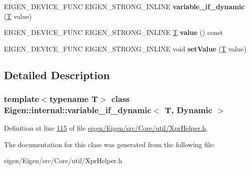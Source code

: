 \begin{DoxyCompactItemize}
E\+I\+G\+E\+N\+\_\+\+D\+E\+V\+I\+C\+E\+\_\+\+F\+U\+NC E\+I\+G\+E\+N\+\_\+\+S\+T\+R\+O\+N\+G\+\_\+\+I\+N\+L\+I\+NE {\bfseries variable\+\_\+if\+\_\+dynamic} (\hyperlink{group___sparse_core___module}{T} value)
\item 
\mbox{\label{class_eigen_1_1internal_1_1variable__if__dynamic_3_01_t_00_01_dynamic_01_4_a888489cd207291bb18a71545f94a7529}} 
E\+I\+G\+E\+N\+\_\+\+D\+E\+V\+I\+C\+E\+\_\+\+F\+U\+NC E\+I\+G\+E\+N\+\_\+\+S\+T\+R\+O\+N\+G\+\_\+\+I\+N\+L\+I\+NE \hyperlink{group___sparse_core___module}{T} {\bfseries value} () const
\item 
\mbox{\label{class_eigen_1_1internal_1_1variable__if__dynamic_3_01_t_00_01_dynamic_01_4_a8557515f971577b2e7949a69577513fd}} 
E\+I\+G\+E\+N\+\_\+\+D\+E\+V\+I\+C\+E\+\_\+\+F\+U\+NC E\+I\+G\+E\+N\+\_\+\+S\+T\+R\+O\+N\+G\+\_\+\+I\+N\+L\+I\+NE void {\bfseries set\+Value} (\hyperlink{group___sparse_core___module}{T} value)
\end{DoxyCompactItemize}


\subsection{Detailed Description}
\subsubsection*{template$<$typename T$>$\newline
class Eigen\+::internal\+::variable\+\_\+if\+\_\+dynamic$<$ T, Dynamic $>$}



Definition at line \hyperlink{eigen_2_eigen_2src_2_core_2util_2_xpr_helper_8h_source_l00115}{115} of file \hyperlink{eigen_2_eigen_2src_2_core_2util_2_xpr_helper_8h_source}{eigen/\+Eigen/src/\+Core/util/\+Xpr\+Helper.\+h}.



The documentation for this class was generated from the following file\+:\begin{DoxyCompactItemize}
\item 
eigen/\+Eigen/src/\+Core/util/\+Xpr\+Helper.\+h\end{DoxyCompactItemize}
